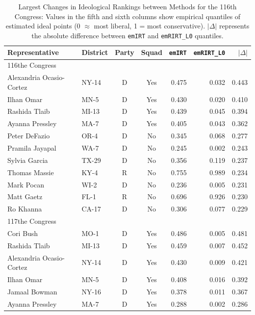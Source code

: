 \documentclass[11pt]{article}
\begin{document}
\begin{table}[!htb]
\small
\centering
\caption{Largest Changes in Ideological Rankings between Methods for the 116th Congress: Values in the fifth and sixth columns show empirical quantiles of estimated ideal points (0 $\approx$ most liberal, 1 = most conservative). $|\Delta|$ represents the absolute difference between \texttt{emIRT} and  \texttt{emRIRT\_L0} quantiles.}
\begin{tabular}{llccrrr}
\toprule
\textbf{Representative} & \textbf{District} & \textbf{Party} & \textbf{Squad} & \texttt{emIRT} & \texttt{emRIRT\_L0} & \textbf{$|\Delta|$} \\ 
\midrule
116the Congress\\
\midrule
Alexandria Ocasio-Cortez & NY-14 & D & Yes & 0.475 & 0.032 & 0.443 \\ 
Ilhan Omar               & MN-5  & D & Yes & 0.430 & 0.020 & 0.410 \\ 
Rashida Tlaib            & MI-13 & D & Yes & 0.439 & 0.045 & 0.394 \\ 
Ayanna Pressley          & MA-7  & D & Yes & 0.405 & 0.043 & 0.362 \\ 
Peter DeFazio            & OR-4  & D & No  & 0.345 & 0.068 & 0.277 \\ 
Pramila Jayapal          & WA-7  & D & No  & 0.245 & 0.002 & 0.243 \\ 
Sylvia Garcia            & TX-29 & D & No  & 0.356 & 0.119 & 0.237 \\ 
Thomas Massie            & KY-4  & R & No  & 0.755 & 0.989 & 0.234 \\ 
Mark Pocan               & WI-2  & D & No  & 0.236 & 0.005 & 0.231 \\ 
Matt Gaetz               & FL-1  & R & No  & 0.696 & 0.926 & 0.230 \\ 
Ro Khanna                & CA-17 & D & No  & 0.306 & 0.077 & 0.229 \\ 
\midrule
117the Congress\\
\midrule
Cori Bush               & MO-1  & D & Yes  & 0.486 & 0.005 & 0.481 \\
Rashida Tlaib           & MI-13 & D & Yes  & 0.459 & 0.007 & 0.452 \\
Alexandria Ocasio-Cortez & NY-14 & D & Yes  & 0.430 & 0.009 & 0.421 \\
Ilhan Omar              & MN-5  & D & Yes  & 0.408 & 0.016 & 0.392 \\
Jamaal Bowman           & NY-16 & D & Yes  & 0.378 & 0.011 & 0.367 \\
Ayanna Pressley         & MA-7  & D & Yes  & 0.288 & 0.002 & 0.286 \\

\end{tabular}
\end{table}
\end{document}
